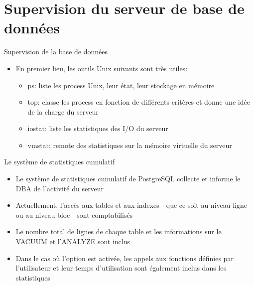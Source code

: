 
\section{Supervision du serveur de base de données}


\begin{frame}[fragile]{Supervision de la base de données}

   \begin{itemize}
      \item En premier lieu, les outils Unix suivants sont très utiles:
      \begin{itemize}
         \item ps: liste les process Unix, leur état, leur stockage en mémoire
         \item top: classe les process en fonction de différents critères et donne une idée de la charge du serveur
         \item iostat: liste les statistiques des I/O du serveur
         \item vmstat: remote des statistiques sur la mémoire virtuelle du serveur
      \end{itemize}
   \end{itemize}

\begin{toile}
\end{toile}

\end{frame}


\begin{frame}[fragile]{Le système de statistiques cumulatif}

   \begin{itemize}
      \item Le système de statistiques cumulatif de PostgreSQL collecte et informe le DBA de l'activité du serveur
      \item Actuellement, l'accès aux tables et aux indexes - que ce soit au niveau ligne ou au niveau bloc - sont comptabilisés
      \item Le nombre total de lignes de chaque table et les informations sur le VACUUM et l'ANALYZE sont inclus
      \item Dans le cas où l'option est activée, les appels aux fonctions définies par l'utilisateur et leur temps d'utilisation sont également inclus dans les statistiques
   \end{itemize}

\begin{toile}
\end{toile}

\end{frame}


